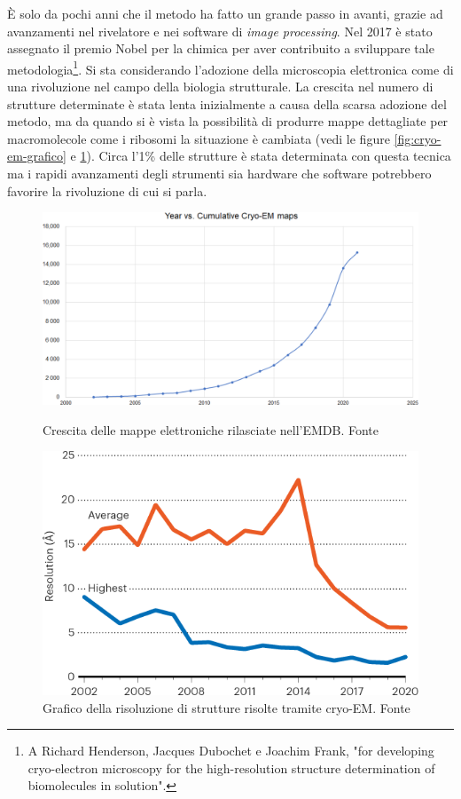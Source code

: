 { È solo da pochi anni che il metodo ha fatto un grande passo in avanti, grazie ad avanzamenti nel rivelatore e nei software di \textit{image processing}. Nel 2017 è stato assegnato il premio Nobel per la chimica per aver contribuito a sviluppare tale metodologia\footnote{A Richard Henderson, Jacques Dubochet e Joachim Frank, "for developing cryo-electron microscopy for the high-resolution structure determination of biomolecules in solution".}.
Si sta considerando l'adozione della microscopia elettronica come di una rivoluzione nel campo della biologia strutturale\supercite{callaway2020revolutionary, bai2015cryo}. La crescita nel numero di strutture determinate è stata lenta inizialmente a causa della scarsa adozione del metodo, ma da quando si è vista la possibilità di produrre mappe dettagliate per macromolecole come i ribosomi la situazione è cambiata (vedi le figure \ref{fig:cryo-em-grafico} e \ref{fig:cryo-em-resolution}). Circa l'1\% delle strutture è stata determinata con questa tecnica ma i rapidi avanzamenti degli strumenti sia hardware che software potrebbero favorire la rivoluzione di cui si parla. 

\begin{figure}[!htb]
	\centering
	\includegraphics[scale=0.65]{images/cryo-em-grafico.png}
	\caption{Crescita delle mappe elettroniche rilasciate nell'EMDB. Fonte\cite{pakhrin2021deep}}
	\label{fig:cryo-em-grafico}
	\endminipage\hfill
	\centering
	\includegraphics[scale=0.35]{images/cryo-em-resolution.png}
	\caption{Grafico della risoluzione di strutture risolte tramite cryo-EM. Fonte \cite{callaway2020revolutionary}}
	\label{fig:cryo-em-resolution}
	\endminipage\hfill
\end{figure}
}

